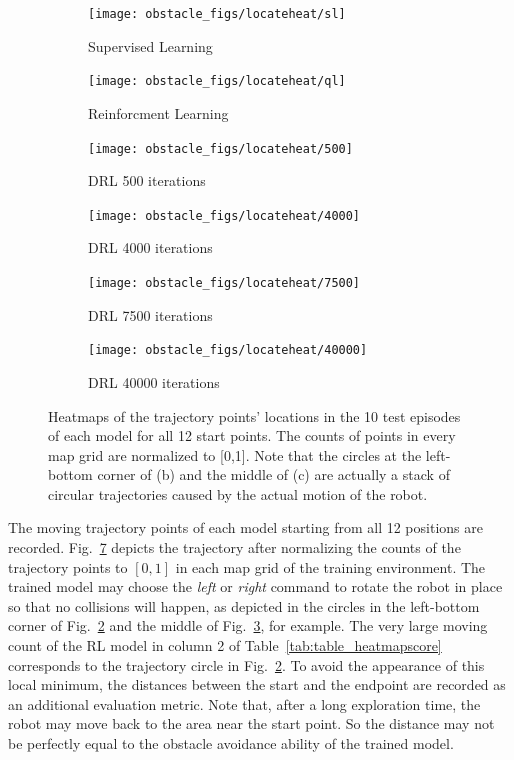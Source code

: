 \begin{figure}[!ht]
    \centering
    \begin{subfigure}[t]{0.48\columnwidth}
      \centering
      \texttt{[image: obstacle\_figs/locateheat/sl]}
      \caption{Supervised Learning}
      \label{fig:heatsl}
    \end{subfigure}
    \begin{subfigure}[t]{0.48\columnwidth}
      \centering
      \texttt{[image: obstacle\_figs/locateheat/ql]}
      \caption{Reinforcment Learning}
      \label{fig:heatql}
    \end{subfigure}
    \begin{subfigure}[t]{0.48\columnwidth}
      \centering
      \texttt{[image: obstacle\_figs/locateheat/500]}
      \caption{DRL 500 iterations}
      \label{fig:heat500}
    \end{subfigure}
    \begin{subfigure}[t]{0.48\columnwidth}
      \centering
      \texttt{[image: obstacle\_figs/locateheat/4000]}
      \caption{DRL 4000 iterations}
      \label{fig:heat4000}
    \end{subfigure}
    \begin{subfigure}[t]{0.48\columnwidth}
      \centering
      \texttt{[image: obstacle\_figs/locateheat/7500]}
      \caption{DRL 7500 iterations}
      \label{fig:heat7500}
    \end{subfigure}
    \begin{subfigure}[t]{0.48\columnwidth}
      \centering
      \texttt{[image: obstacle\_figs/locateheat/40000]}
      \caption{DRL 40000 iterations}
      \label{fig:heat40000}
    \end{subfigure}
    \caption{Heatmaps of the trajectory points' locations in the 10 test episodes of each model for all 12 start points. The counts of points in every map grid are normalized to [0,1]. Note that the circles at the left-bottom corner of (b) and the middle of (c) are actually a stack of circular trajectories caused by the actual motion of the robot.}
    \label{fig:heat_map}
\end{figure}

The moving trajectory points of each model starting from all 12 positions are recorded. Fig.~\ref{fig:heat_map} depicts the trajectory after normalizing the counts of the trajectory points to $[0,1]$ in each map grid of the training environment. The trained model may choose the \textit{left} or \textit{right} command to rotate the robot in place so that no collisions will happen, as depicted in the circles in the left-bottom corner of Fig.~\ref{fig:heatql} and the middle of Fig.~\ref{fig:heat500}, for example. The very large moving count of the RL model in column 2 of Table~\ref{tab:table_heatmapscore} corresponds to the trajectory circle in Fig.~\ref{fig:heatql}. To avoid the appearance of this local minimum, the distances between the start and the endpoint are recorded as an additional evaluation metric. Note that, after a long exploration time, the robot may move back to the area near the start point. So the distance may not be perfectly equal to the obstacle avoidance ability of the trained model.


